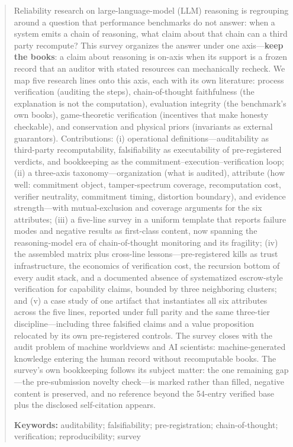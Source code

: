 \documentclass[11pt,a4paper]{article}
\begin{document}
\begin{abstract}


Reliability research on large-language-model (LLM) reasoning is regrouping around a question that performance benchmarks do not answer: when a system emits a chain of reasoning, what claim about that chain can a third party recompute? This survey organizes the answer under one axis—\textbf{keep the books}: a claim about reasoning is on-axis when its support is a frozen record that an auditor with stated resources can mechanically recheck. We map five research lines onto this axis, each with its own literature: process verification (auditing the steps), chain-of-thought faithfulness (the explanation is not the computation), evaluation integrity (the benchmark's own books), game-theoretic verification (incentives that make honesty checkable), and conservation and physical priors (invariants as external guarantors). Contributions: (i) operational definitions—auditability as third-party recomputability, falsifiability as executability of pre-registered verdicts, and bookkeeping as the commitment–execution–verification loop; (ii) a three-axis taxonomy—organization (what is audited), attribute (how well: commitment object, tamper-spectrum coverage, recomputation cost, verifier neutrality, commitment timing, distortion boundary), and evidence strength—with mutual-exclusion and coverage arguments for the six attributes; (iii) a five-line survey in a uniform template that reports failure modes and negative results as first-class content, now spanning the reasoning-model era of chain-of-thought monitoring and its fragility; (iv) the assembled matrix plus cross-line lessons—pre-registered kills as trust infrastructure, the economics of verification cost, the recursion bottom of every audit stack, and a documented absence of systematized escrow-style verification for capability claims, bounded by three neighboring clusters; and (v) a case study of one artifact that instantiates all six attributes across the five lines, reported under full parity and the same three-tier discipline—including three falsified claims and a value proposition relocated by its own pre-registered controls. The survey closes with the audit problem of machine worldviews and AI scientists: machine-generated knowledge entering the human record without recomputable books. The survey's own bookkeeping follows its subject matter: the one remaining gap—the pre-submission novelty check—is marked rather than filled, negative content is preserved, and no reference beyond the 54-entry verified base plus the disclosed self-citation appears.

\noindent\textbf{Keywords:} auditability; falsifiability; pre-registration; chain-of-thought; verification; reproducibility; survey
\end{abstract}
\end{document}
